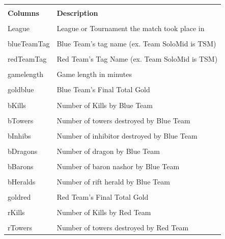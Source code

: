 \documentclass[conference]{IEEEtran}
\begin{document}
\begin{table}[!ht]
    \begin{tabular}{|| l | l ||}
        \hline
        \\[-1em]
        \textbf{Columns} & \textbf{Description} \\
        \hline\hline
        \\[-1em]
        League & League or Tournament the match took place in\\
        \hline
        \\[-1em]
        blueTeamTag & Blue Team's tag name (ex. Team SoloMid is TSM)\\
        \hline
        \\[-1em]
        redTeamTag & Red Team's Tag Name (ex. Team SoloMid is TSM)\\
        \hline
        \\[-1em]
        gamelength & Game length in minutes\\
        \hline
        \\[-1em]
        goldblue & Blue Team's Final Total Gold\\
        \hline
        \\[-1em]
        bKills & Number of Kills by Blue Team\\
        \hline
        \\[-1em]
        bTowers & Number of towers destroyed by Blue Team\\
        \hline
        \\[-1em]
        bInhibs & Number of inhibitor destroyed by Blue Team \\
        \hline
        \\[-1em]
        bDragons & Number of dragon by Blue Team\\
        \hline
        \\[-1em]
        bBarons & Number of baron nashor by Blue Team\\
        \hline
        \\[-1em]
        bHeralds & Number of rift herald by Blue Team\\
        \hline
        \\[-1em]
        goldred & Red Team's Final Total Gold\\
        \hline
        \\[-1em]
        rKills & Number of Kills by Red Team\\
        \hline
        \\[-1em]
        rTowers & Number of towers destroyed by Red Team\\

\end{tabular}
\end{table}
\end{document}
